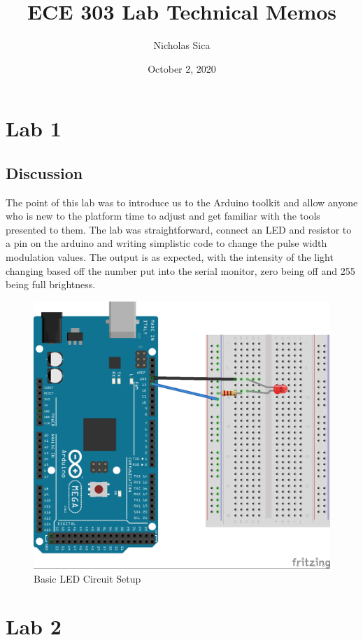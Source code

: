 \documentclass[12pt,titlepage]{article}
\begin{document}
\title{ECE 303 Lab Technical Memos}
\author{Nicholas Sica}
\date{October 2, 2020}
\maketitle

\tableofcontents
\newpage

\section{Lab 1}
\subsection{Discussion}
The point of this lab was to introduce us to the Arduino toolkit and allow anyone who is new to the platform
time to adjust and get familiar with the tools presented to them. The lab was straightforward, connect an LED
and resistor to a pin on the arduino and writing simplistic code to change the pulse width modulation values.
The output is as expected, with the intensity of the light changing based off the number put into the serial
monitor, zero being off and 255 being full brightness.
\begin{figure}[!htb]
  \centering
  \includegraphics[width=5.0in]{lab_1/schematic.png}
  \caption{Basic LED Circuit Setup}\label{fig:lab_1}
\end{figure}
\newpage
\section{Lab 2}
\end{document}
